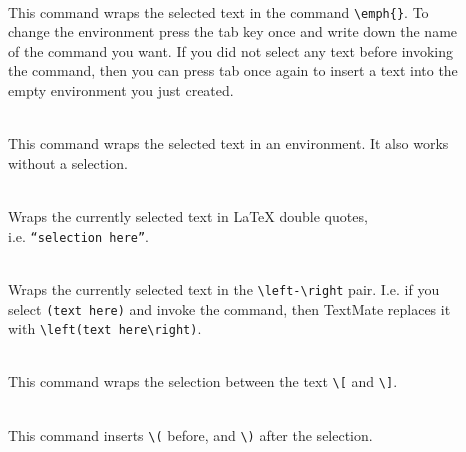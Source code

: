 \documentclass[11pt, x11names]{article}
\begin{document}
\begin{description}

    \item[]~\hfill~\\

    This command wraps the selected text in the command \texttt{\textbackslash{}emph\{\}}. To change the environment press the tab key once and write down the name of the command you want. If you did not select any text before invoking the command, then you can press tab once again to insert a text into the empty environment you just created.

    \item[]~\hfill~\\

    This command wraps the selected text in an environment. It also works without a selection.

    \item[]~\hfill~\\

    Wraps the currently selected text in LaTeX double quotes,\\
    i.e. \texttt{``selection here''}.

    \item[]~\hfill~\\

    Wraps the currently selected text in the \texttt{\textbackslash{}left-\textbackslash{}right} pair. I.e. if you select \texttt{(text\ here)} and invoke the command, then TextMate replaces it with \texttt{\textbackslash{}left(text\ here\textbackslash{}right)}.

    \item[]~\hfill~\\

    This command wraps the selection between the text \texttt{\textbackslash{}{[}} and \texttt{\textbackslash{}{]}}.

    \item[]~\hfill~\\

    This command inserts \texttt{\textbackslash{}(} before, and \texttt{\textbackslash{})} after the selection.

\end{description}
\end{document}
